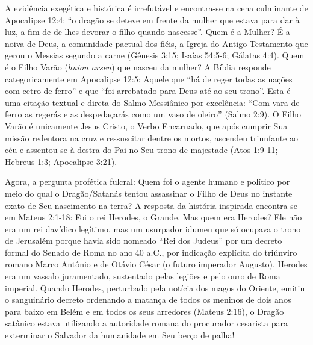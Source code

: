 A evidência exegética e histórica é irrefutável e encontra-se na cena culminante de Apocalipse 12:4: ``o dragão se deteve em frente da mulher que estava para dar à luz, a fim de de lhes devorar o filho quando nascesse''.
Quem é a Mulher? É a noiva de Deus, a comunidade pactual dos fiéis, a Igreja do Antigo Testamento que gerou o Messias segundo a carne (Gênesis 3:15; Isaías 54:5-6; Gálatas 4:4).
Quem é o Filho Varão (\textit{huion arsen}) que nasceu da mulher? A Bíblia responde categoricamente em Apocalipse 12:5: Aquele que ``há de reger todas as nações com cetro de ferro'' e que ``foi arrebatado para Deus até ao seu trono''. Esta é uma citação textual e direta do Salmo Messiânico por excelência: ``Com vara de ferro as regerás e as despedaçarás como um vaso de oleiro'' (Salmo 2:9). O Filho Varão é unicamente Jesus Cristo, o Verbo Encarnado, que após cumprir Sua missão redentora na cruz e ressuscitar dentre os mortos, ascendeu triunfante ao céu e assentou-se à destra do Pai no Seu trono de majestade (Atos 1:9-11; Hebreus 1:3; Apocalipse 3:21).

Agora, a pergunta profética fulcral: Quem foi o agente humano e político por meio do qual o Dragão/Satanás tentou assassinar o Filho de Deus no instante exato de Seu nascimento na terra?
A resposta da história inspirada encontra-se em Mateus 2:1-18: Foi o rei Herodes, o Grande. Mas quem era Herodes? Ele não era um rei davídico legítimo, mas um usurpador idumeu que só ocupava o trono de Jerusalém porque havia sido nomeado ``Rei dos Judeus'' por um decreto formal do Senado de Roma no ano 40 a.C., por indicação explícita do triúnviro romano Marco Antônio e de Otávio César (o futuro imperador Augusto). Herodes era um vassalo juramentado, sustentado pelas legiões e pelo ouro de Roma imperial. Quando Herodes, perturbado pela notícia dos magos do Oriente, emitiu o sanguinário decreto ordenando a matança de todos os meninos de dois anos para baixo em Belém e em todos os seus arredores (Mateus 2:16), o Dragão satânico estava utilizando a autoridade romana do procurador cesarista para exterminar o Salvador da humanidade em Seu berço de palha!

